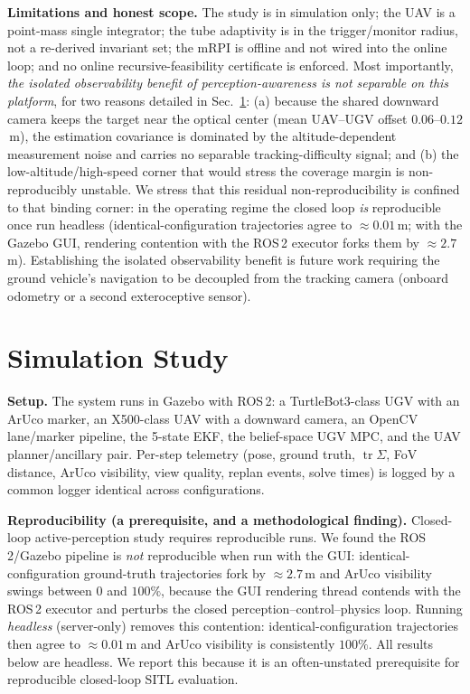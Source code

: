 \documentclass[letterpaper, 10 pt, conference]{ieeeconf}  %
\DeclareMathOperator{\tr}{tr}
\newcommand{\RESforkGUI}{2.7}\newcommand{\RESforkHL}{0.01}
\begin{document}
\textbf{Limitations and honest scope.} The study is in simulation only; the UAV is
a point-mass single integrator; the tube adaptivity is in the trigger/monitor
radius, not a re-derived invariant set; the mRPI is offline and not wired into the
online loop; and no online recursive-feasibility certificate is enforced. Most
importantly, \emph{the isolated observability benefit of perception-awareness is
not separable on this platform}, for two reasons detailed in Sec.~\ref{sec:results}:
(a) because the shared downward camera keeps the target near the optical center (mean
UAV--UGV offset $0.06$--$0.12$\,m), the estimation covariance is dominated by the
altitude-dependent measurement noise and carries no separable tracking-difficulty
signal; and (b) the low-altitude/high-speed corner that would stress the coverage
margin is non-reproducibly unstable. We stress that this residual non-reproducibility
is confined to that binding corner: in the operating regime the closed loop \emph{is}
reproducible once run headless (identical-configuration trajectories agree to
$\approx\!\RESforkHL$\,m; with the Gazebo GUI, rendering contention with the ROS\,2
executor forks them by $\approx\!\RESforkGUI$\,m). Establishing the isolated
observability benefit is future work requiring the ground vehicle's navigation to be
decoupled from the tracking camera (onboard odometry or a second exteroceptive sensor).

\section{Simulation Study}
\label{sec:results}

\textbf{Setup.} The system runs in Gazebo with ROS\,2: a TurtleBot3-class UGV with
an ArUco marker, an X500-class UAV with a downward camera, an OpenCV lane/marker
pipeline, the 5-state EKF, the belief-space UGV MPC, and the UAV
planner/ancillary pair. Per-step telemetry (pose, ground truth, $\tr\Sigma$, FoV
distance, ArUco visibility, view quality, replan events, solve times) is logged
by a common logger identical across configurations.

\textbf{Reproducibility (a prerequisite, and a methodological finding).} Closed-loop
active-perception study requires reproducible runs. We found the ROS\,2/Gazebo pipeline is
\emph{not} reproducible when run with the GUI: identical-configuration ground-truth
trajectories fork by $\approx\!\RESforkGUI$\,m and ArUco visibility swings between $0$ and
$100\%$, because the GUI rendering thread contends with the ROS\,2 executor and perturbs the
closed perception--control--physics loop. Running \emph{headless} (server-only) removes this
contention: identical-configuration trajectories then agree to $\approx\!\RESforkHL$\,m and
ArUco visibility is consistently $100\%$. All results below are headless. We report this
because it is an often-unstated prerequisite for reproducible closed-loop SITL evaluation.
\end{document}
